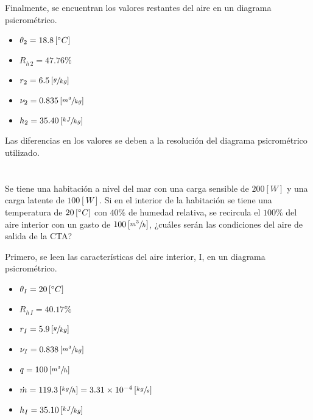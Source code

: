 \documentclass[11pt]{article}
\begin{document}
Finalmente, se encuentran los valores restantes del aire en un diagrama psicrométrico.

\begin{itemize}
    \item
    $ \theta _2 = 18.8 \left[ \degree C \right] $
    
    \item
    $ R_{ h \, 2 } = 47.76\% $
    
    \item
    $ r_2 = 6.5 \left[ \sfrac{ g }{ kg } \right] $
    
    \item
    $ \nu_2 = 0.835 \left[ \sfrac{ m^3 }{ kg } \right] $
    
    \item
    $ h_2 = 35.40 \left[ \sfrac{ kJ }{ kg } \right] $

\end{itemize}

Las diferencias en los valores se deben a la resolución del diagrama psicrométrico utilizado.

\section{}

Se tiene una habitación a nivel del mar con una carga sensible de $ 200 \left[ W \right] $ y una carga latente de $ 100 \left[ W \right] $. Si en el interior de la habitación se tiene una temperatura de $ 20 \left[ \degree C \right] $ con $ 40\% $ de humedad relativa, se recircula el $ 100\% $ del aire interior con un gasto de $ 100 \left[ \sfrac{ m^3 }{ h } \right] $, ¿cuáles serán las condiciones del aire de salida de la CTA?

Primero, se leen las características del aire interior, I, en un diagrama psicrométrico.

\begin{itemize}
    \item
    $ \theta _I = 20 \left[ \degree C \right] $
    
    \item
    $ R_{ h \, I } = 40.17\% $
    
    \item
    $ r_I = 5.9 \left[ \sfrac{ g }{ kg } \right] $
    
    \item
    $ \nu _I = 0.838 \left[ \sfrac{ m^3 }{ kg } \right] $
    
    \item
    $ q = 100 \left[ \sfrac{ m^3 }{ h } \right] $
    
    \item
    $ \dot{ m } = 119.3 \left[ \sfrac{ kg }{ h } \right] = 3.31 \times 10^{ -4 } \left[ \sfrac{ kg }{ s } \right] $
    
    \item
    $ h_I = 35.10 \left[ \sfrac{ kJ }{ kg } \right] $

\end{itemize}
\end{document}
